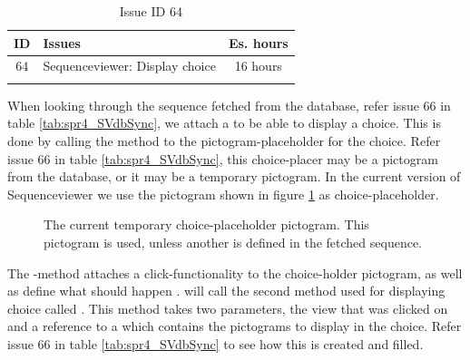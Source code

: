 \begin{longtable} { | c | p{12cm} | c | } 
\hline
	ID 	&	Issues	&		 Es. hours \\\hline
	 64	&	Sequenceviewer: Display choice	&	16 hours \\\hline
\caption{Issue ID 64}
\label{tab:spr4_SVdisplayChoice}
\end{longtable}

When looking through the sequence fetched from the database, refer issue 66 in table \ref{tab:spr4_SVdbSync}, we attach a  to be able to display a choice. This is done by calling the method  to the pictogram-placeholder for the choice. Refer issue 66 in table \ref{tab:spr4_SVdbSync}, this choice-placer may be a pictogram from the database, or it may be a temporary pictogram. In the current version of Sequenceviewer we use the pictogram shown in figure \ref{fig:choiceplaceholder} as choice-placeholder.

\begin{figure}[H]
	\centering
	\caption{The current temporary choice-placeholder pictogram. This pictogram is used, unless another is defined in the fetched sequence.}
	\label{fig:choiceplaceholder}
\end{figure}

The -method attaches a click-functionality to the choice-holder pictogram, as well as define what should happen .  will call the second method used for displaying choice called . This method takes two parameters, the view that was clicked on and a reference to a  which contains the pictograms to display in the choice. Refer issue 66 in table \ref{tab:spr4_SVdbSync} to see how this  is created and filled.

